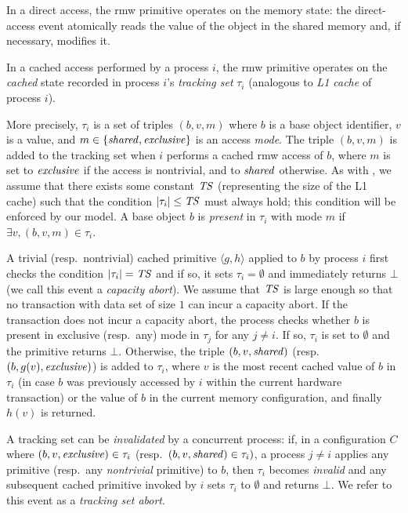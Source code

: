 In a direct access, the rmw primitive operates on the memory state:
the direct-access event atomically reads the value of the object in
the shared memory and, if necessary, modifies it.

In a cached access performed by a process $i$, the rmw primitive operates on the \emph{cached}
state recorded in process $i$'s \emph{tracking set} $\tau_i$ (analogous to \emph{L1 cache} of process $i$). 
 
More precisely, $\tau_i$ is a set of triples $(b, v, m)$ where $b$ is a base object identifier, $v$ is a value, 
and $m \in \{\mathit{shared}, \mathit{exclusive}\}$ is an access \emph{mode}. 
The triple $(b, v, m)$ is added to the tracking set when $i$ performs a cached
rmw access of $b$, where $m$ is set to $\mathit{exclusive}$ if the access is
nontrivial, and to $\mathit{shared}$ otherwise.  
As with \cite{htmdisc15}, we assume that there exists some constant $\mathit{TS}$ (representing the size of the L1 cache)
such that the condition $|\tau_i| \leq \mathit{TS}$ must always hold; this
condition will be enforced by our model.
A base object $b$ is \emph{present} in $\tau_i$ with mode $m$ if $\exists v, (b,v,m) \in \tau_i$.

A trivial (resp.\ nontrivial) 
cached primitive $\langle g,h \rangle$ applied to $b$ 
by process $i$ first checks the condition $|\tau_i|=\mathit{TS}$ and if so, it
sets $\tau_i=\emptyset$ and immediately returns $\bot$ (we call this event a
\emph{capacity abort}). 
We assume that $\mathit{TS}$ is large enough so that no transaction 
with data set of size $1$ can incur a capacity abort.
%
If the transaction does not incur a capacity abort, the process checks whether $b$ is present in exclusive
(resp.\ any) mode in $\tau_j$ 
for any $j\neq i$. If so, $\tau_i$ is set to $\emptyset$ and the
primitive returns $\bot$. 
%
Otherwise, the triple $(b, v, \mathit{shared})$ (resp. $(b, g(v), \mathit{exclusive})$)
is added to $\tau_i$,  where $v$ is the most recent cached value of $b$ in $\tau_i$
(in case $b$ was previously accessed by $i$ within the current
hardware transaction) or the value of $b$ in the current
memory configuration, and finally $h(v)$ is returned.
%

A tracking set can be \emph{invalidated} by a concurrent process: 
if, in a configuration $C$ where  $(b,v,\mathit{exclusive})\in\tau_i$
(resp.\ $(b,v,\mathit{shared})\in\tau_i)$,  a process $j\neq i$ applies any primitive 
(resp.\ any \emph{nontrivial} primitive) to $b$, then $\tau_i$ becomes
\emph{invalid} and any subsequent cached primitive invoked by $i$
sets $\tau_i$ to $\emptyset$ and returns $\bot$. We refer to this event as a \emph{tracking set abort}.

